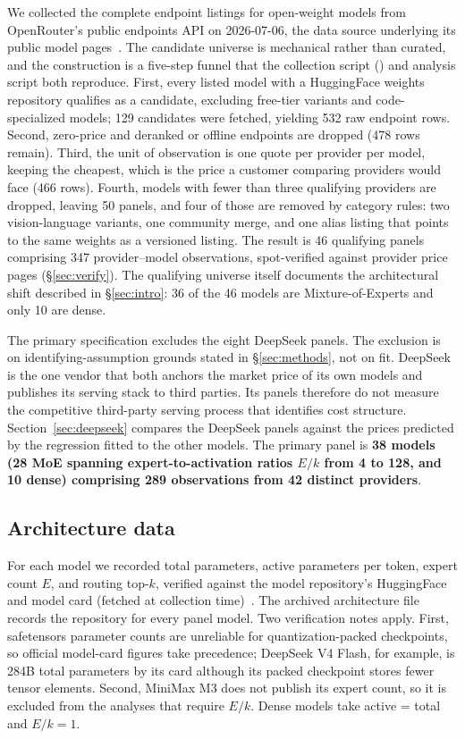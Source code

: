 \documentclass[11pt]{article}
\begin{document}
We collected the complete endpoint listings for open-weight models from
OpenRouter's public endpoints API on 2026-07-06, the data source underlying
its public model pages~\cite{r1,r2}. The candidate universe is mechanical
rather than curated, and the construction is a five-step funnel that the
collection script () and analysis script both
reproduce. First, every listed model with a HuggingFace weights repository
qualifies as a candidate, excluding free-tier variants and code-specialized
models; 129 candidates were fetched, yielding 532 raw endpoint rows. Second,
zero-price and deranked or offline endpoints are dropped (478 rows remain).
Third, the unit of observation is one quote per provider per model, keeping
the cheapest, which is the price a customer comparing providers would face
(466 rows). Fourth, models with fewer than three qualifying providers are
dropped, leaving 50 panels, and four of those are removed by category rules:
two vision-language variants, one community merge, and one alias listing
that points to the same weights as a versioned listing. The result is 46
qualifying panels comprising 347 provider--model observations, spot-verified
against provider price pages (\S\ref{sec:verify}). The qualifying universe
itself documents the architectural shift described in \S\ref{sec:intro}:
36 of the 46 models are Mixture-of-Experts and only 10 are dense.

The primary specification excludes the eight DeepSeek panels. The exclusion
is on identifying-assumption grounds stated in \S\ref{sec:methods}, not on
fit. DeepSeek is the one vendor that both anchors the market price of its
own models and publishes its serving stack to third parties. Its panels
therefore do not measure the competitive third-party serving process that
identifies cost structure. Section~\ref{sec:deepseek} compares the DeepSeek panels
against the prices predicted by the regression fitted to the other models. The primary panel is
\textbf{38 models (28 MoE spanning expert-to-activation ratios $E/k$ from 4
to 128, and 10 dense) comprising 289 observations from 42 distinct
providers}.

\subsection{Architecture data}

For each model we recorded total parameters, active parameters per token,
expert count $E$, and routing top-$k$, verified against the model
repository's HuggingFace  and model card (fetched at
collection time)~\cite{hf_scout,hf_maverick,hf_qwen,hf_kimi,hf_oss,hf_glm,hf_minimax,hf_r1}.
The archived architecture file records the repository for every panel model.
Two verification notes apply. First, safetensors parameter counts are
unreliable for quantization-packed checkpoints, so official model-card
figures take precedence; DeepSeek V4 Flash, for example, is 284B total
parameters by its card although its packed checkpoint stores fewer tensor
elements. Second, MiniMax M3 does not publish its expert count, so it is
excluded from the analyses that require $E/k$. Dense models take active =
total and $E/k = 1$.
\end{document}
